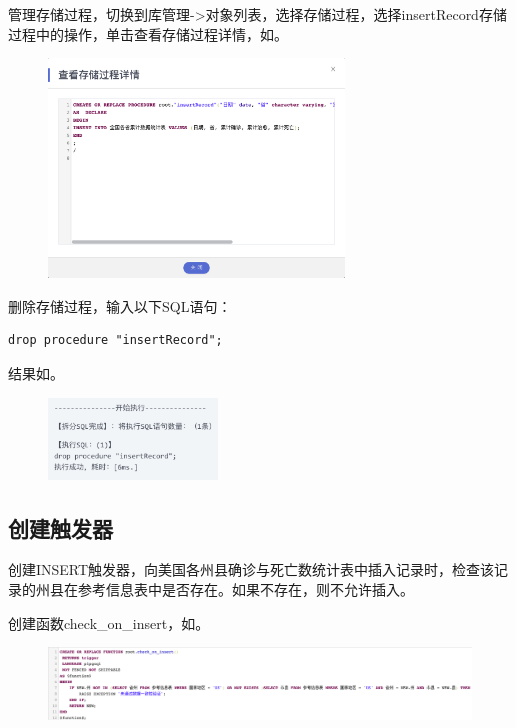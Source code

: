 \documentclass[lang=cn,11pt,a4paper,cite=authornum]{paper}
\begin{document}
管理存储过程，切换到库管理->对象列表，选择存储过程，选择insertRecord存储过程中的操作，单击查看存储过程详情，如。
\begin{figure}[!htb]
    \centering
    \includegraphics[width=0.7\textwidth]{./images/res31.png}
    \caption{\label{fig:res31}}
\end{figure}

删除存储过程，输入以下SQL语句：
\begin{code}
\begin{verbatim}
drop procedure "insertRecord";
\end{verbatim}
\end{code}

结果如。
\begin{figure}[!htb]
    \centering
    \includegraphics[width=0.4\textwidth]{./images/res32.png}
    \caption{\label{fig:res32}}
\end{figure}

\subsection{创建触发器}

创建INSERT触发器，向美国各州县确诊与死亡数统计表中插入记录时，检查该记录的州县在参考信息表中是否存在。如果不存在，则不允许插入。

创建函数check\_on\_insert，如。
\begin{figure}[!htb]
    \centering
    \includegraphics[width=\textwidth]{./images/res33.png}
    \caption{\label{fig:res33}}
\end{figure}
\end{document}
